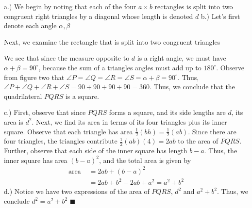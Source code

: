 \documentclass{report}
\begin{document}
    \begin{figure}[ht]
        \centering
        \label{fig:fig3}
    \end{figure}
    \fc{}
    \bigbreak \noindent 
    a.) We begin by noting that each of the four $a\times b$ rectangles is split into two congruent right triangles by a diagonal whose length is denoted $d$
    \pagebreak \bigbreak \noindent 
    b.) Let's first denote each angle $\alpha, \beta$
    \bigbreak \noindent 
    \begin{figure}[ht]
        \centering
        \label{fig:alpha}
    \end{figure}
    \fc{}
    \bigbreak \noindent 
    Next, we examine the rectangle that is split into two congruent triangles
    \bigbreak \noindent 
    \begin{figure}[ht]
        \centering
        \label{fig:triangle}
    \end{figure}
    \fc{}
    \bigbreak \noindent 
    We see that since the measure opposite to $d$ is a right angle, we must have $\alpha + \beta = 90^{\circ}$, because the sum of a triangles angles must add up to $180^{\circ}$.
    \bigbreak \noindent 
    Observe from figure two that $\angle P  = \angle Q = \angle R = \angle S = \alpha + \beta = 90^{\circ}$. Thus, $\angle P + \angle Q + \angle R + \angle S = 90 + 90 + 90 + 90 = 360$. Thus, we conclude that the quadrilateral $PQRS$ is a square.

    \bigbreak \noindent 
    c.) First, observe that since $PQRS$ forms a square, and its side lengths are $d$, its area is $d^{2}$. Next, we find its area in terms of its four triangles plus its inner square. Observe that each triangle has area $\frac{1}{2}(bh) = \frac{1}{2}(ab)$. Since there are four triangles, the triangles contribute $\frac{1}{2}(ab)(4) = 2ab$ to the area of $PQRS$. Further, observe that each side of the inner square has length $b-a$. Thus, the inner square has area $(b-a)^{2}$, and the total area is given by
    \begin{align*}
        \text{area } &= 2ab + (b-a)^{2} \\
        &= 2ab +b^{2}-2ab + a^{2} = a^{2} + b^{2}
    \end{align*}
    \bigbreak \noindent 
    d.) Notice we have two expressions of the area of $PQRS$, $d^{2}$ and $a^{2} + b^{2}$. Thus, we conclude $d^{2} = a^{2} + b^{2}$  \hspace*{\fill} $\blacksquare $
\end{document}
